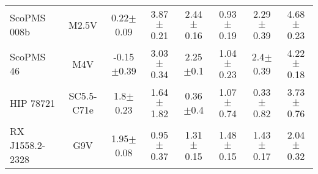 \begin{table}
\begin{center}
\begin{tabular}{l|c|c|c|c|c|c|c}
ScoPMS 008b & M2.5V & 0.22$\pm$0.09 & 3.87$\pm$0.21 & 2.44$\pm$0.16 & 0.93$\pm$0.19 & 2.29$\pm$0.39 & 4.68$\pm$0.23 \\
ScoPMS 46 & M4V & -0.15$\pm$0.39 & 3.03$\pm$0.34 & 2.25$\pm$0.1 & 1.04$\pm$0.23 & 2.4$\pm$0.39 & 4.22$\pm$0.18 \\
HIP 78721 & SC5.5-C71e & 1.8$\pm$0.23 & 1.64$\pm$1.82 & 0.36$\pm$0.4 & 1.07$\pm$0.74 & 0.33$\pm$0.82 & 3.73$\pm$0.76 \\
RX J1558.2-2328 & G9V & 1.95$\pm$0.08 & 0.95$\pm$0.37 & 1.31$\pm$0.15 & 1.48$\pm$0.15 & 1.43$\pm$0.17 & 2.04$\pm$0.32 \\
\end{tabular}
\end{center}
\end{table}
